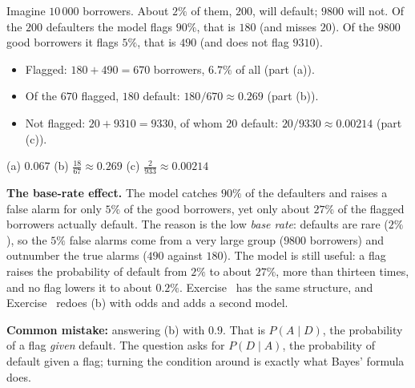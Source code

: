 \begin{solution}
	 Imagine $10\,000$ borrowers. About $2\%$ of
	them, $200$, will default; $9800$ will not. Of the $200$ defaulters the
	model flags $90\%$, that is $180$ (and misses $20$). Of the $9800$ good
	borrowers it flags $5\%$, that is $490$ (and does not flag $9310$).
	\begin{itemize}[nosep]
		\item Flagged: $180+490=670$ borrowers, $6.7\%$ of all (part (a)).
		\item Of the $670$ flagged, $180$ default: $180/670\approx0.269$
		      (part (b)).
		\item Not flagged: $20+9310=9330$, of whom $20$ default:
		      $20/9330\approx0.00214$ (part (c)).
	\end{itemize}
	\begin{answer}
		(a) $0.067$ \quad (b) $\frac{18}{67}\approx0.269$ \quad
		(c) $\frac{2}{933}\approx0.00214$
	\end{answer}
	\begin{remark}
		\textbf{The base-rate effect.} The model catches $90\%$ of the
		defaulters and raises a false alarm for only $5\%$ of the good
		borrowers, yet only about $27\%$ of the flagged borrowers actually
		default. The reason is the low \emph{base rate}: defaults are rare
		($2\%$), so the $5\%$ false alarms come from a very large group ($9800$
		borrowers) and outnumber the true alarms ($490$ against $180$). The model
		is still useful: a flag raises the probability of default from $2\%$ to
		about $27\%$, more than thirteen times, and no flag lowers it to about
		$0.2\%$. Exercise~ has the same structure, and
		Exercise~ redoes (b) with odds and adds a
		second model.
	\end{remark}
	\begin{remark}
		\textbf{Common mistake:} answering (b) with $0.9$. That is
		$P(A\mid D)$, the probability of a flag \emph{given} default. The
		question asks for $P(D\mid A)$, the probability of default given a
		flag; turning the condition around is exactly what Bayes' formula does.
	\end{remark}
\end{solution}
